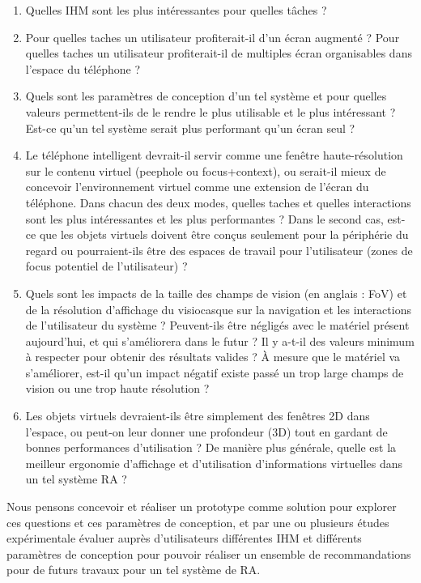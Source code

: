 \begin{enumerate}
  \item Quelles IHM sont les plus intéressantes pour quelles tâches ?
  \item Pour quelles taches un utilisateur profiterait-il d'un écran augmenté ? Pour quelles taches un utilisateur profiterait-il de multiples écran organisables dans l'espace du téléphone ?
  \item Quels sont les paramètres de conception d'un tel système et pour quelles valeurs permettent-ils de le rendre le plus utilisable et le plus intéressant ? Est-ce qu'un tel système serait plus performant qu'un écran seul ?
  \item Le téléphone intelligent devrait-il servir comme une fenêtre haute-résolution sur le contenu virtuel (peephole ou focus+context), ou serait-il mieux de concevoir l'environnement virtuel comme une extension de l'écran du téléphone. Dans chacun des deux modes, quelles taches et quelles interactions sont les plus intéressantes et les plus performantes ? Dans le second cas, est-ce que les objets virtuels doivent être conçus seulement pour la périphérie du regard ou pourraient-ils être des espaces de travail pour l'utilisateur (zones de focus potentiel de l'utilisateur) ?
  \item Quels sont les impacts de la taille des champs de vision (en anglais : FoV) et de la résolution d'affichage du visiocasque sur la navigation et les interactions de l'utilisateur du système ? Peuvent-ils être négligés avec le matériel présent aujourd'hui, et qui s'améliorera dans le futur ? Il y a-t-il des valeurs minimum à respecter pour obtenir des résultats valides ? À mesure que le matériel va s'améliorer, est-il qu'un impact négatif existe passé un trop large champs de vision ou une trop haute résolution ?
  \item Les objets virtuels devraient-ils être simplement des fenêtres 2D dans l'espace, ou peut-on leur donner une profondeur (3D) tout en gardant de bonnes performances d'utilisation ? De manière plus générale, quelle est la meilleur ergonomie d'affichage et d'utilisation d'informations virtuelles dans un tel système RA ?
\end{enumerate}

Nous pensons concevoir et réaliser un prototype comme solution pour explorer ces questions et ces paramètres de conception, et par une ou plusieurs études expérimentale évaluer auprès d'utilisateurs différentes IHM et différents paramètres de conception pour pouvoir réaliser un ensemble de recommandations pour de futurs travaux pour un tel système de RA.



